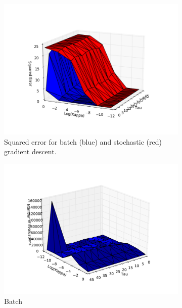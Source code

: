 \documentclass[10pt,psamsfonts]{amsart}
\theoremstyle{definition}
\theoremstyle{remark}
\numberwithin{equation}{section}
\begin{document}
\begin{figure}
		\begin{subfigure}[b]{0.3\textwidth}
			\includegraphics[width=\textwidth]{hw1_1-3_acc_both.png}
			\caption{Squared error for batch (blue) and stochastic (red) gradient descent.}
		\end{subfigure}
			\begin{subfigure}[b]{0.3\textwidth}
				\includegraphics[width=\textwidth]{hw1_1-3_timeGD.pdf}
				\caption{Batch}
			\end{subfigure}
		\begin{subfigure}[b]{0.3\textwidth}

\end{subfigure}
\end{figure}
\end{document}
